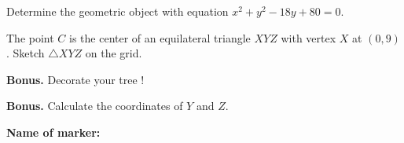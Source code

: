 \documentclass[9pt]{exam}
\begin{document}
\begin{questions}
\begin{minipage}[t]{0.35\textwidth}
\end{minipage}	

\question[3] Determine the geometric object with equation $x^2 + y^2 - 18y  + 80 = 0$.

\question[2] The point $C$ is the center of an equilateral triangle $XYZ$ with vertex $X$ at $(0,9)$. Sketch $\triangle XYZ$ on the grid.

\question[2] \textbf{Bonus.} Decorate your tree !

\question[2] \textbf{Bonus.} Calculate the coordinates of $Y$ and $Z$.


\end{questions}

\begin{tcolorbox}
\textbf{Name of marker:}

\begin{center}
\gradetable[h][questions]
\end{center}
\end{tcolorbox}
\end{document}
